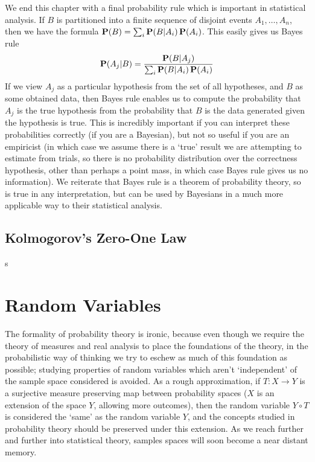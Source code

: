 We end this chapter with a final probability rule which is important in statistical analysis. If $B$ is partitioned into a finite sequence of disjoint events $A_1, \dots, A_n$, then we have the formula $\operatorname{\mathbf{P}}(B) = \sum_i \operatorname{\mathbf{P}}(B | A_i) \operatorname{\mathbf{P}}(A_i)$. This easily gives us Bayes rule
%
\[ \operatorname{\mathbf{P}}(A_j | B) = \frac{\operatorname{\mathbf{P}}(B | A_j)}{\sum_i \operatorname{\mathbf{P}}(B | A_i) \operatorname{\mathbf{P}}(A_i)} \]
%
If we view $A_j$ as a particular hypothesis from the set of all hypotheses, and $B$ as some obtained data, then Bayes rule enables us to compute the probability that $A_j$ is the true hypothesis from the probability that $B$ is the data generated given the hypothesis is true. This is incredibly important if you can interpret these probabilities correctly (if you are a Bayesian), but not so useful if you are an empiricist (in which case we assume there is a `true' result we are attempting to estimate from trials, so there is no probability distribution over the correctness hypothesis, other than perhaps a point mass, in which case Bayes rule gives us no information). We reiterate that Bayes rule is a theorem of probability theory, so is true in any interpretation, but can be used by Bayesians in a much more applicable way to their statistical analysis.

\section{Kolmogorov's Zero-One Law}

s

\chapter{Random Variables}

The formality of probability theory is ironic, because even though we require the theory of measures and real analysis to place the foundations of the theory, in the probabilistic way of thinking we try to eschew as much of this foundation as possible; studying properties of random variables which aren't `independent' of the sample space considered is avoided. As a rough approximation, if $T: X \to Y$ is a surjective measure preserving map between probability spaces ($X$ is an extension of the space $Y$, allowing more outcomes), then the random variable $Y \circ T$ is considered the `same' as the random variable $Y$, and the concepts studied in probability theory should be preserved under this extension. As we reach further and further into statistical theory, samples spaces will soon become a near distant memory.

